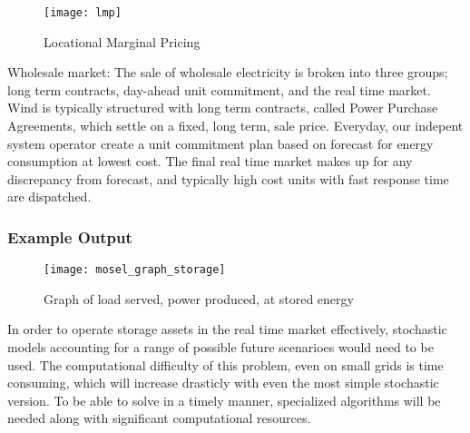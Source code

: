 \begin{figure}
\centering
      \texttt{[image: lmp]}
     \caption{Locational Marginal Pricing}
\end{figure}


Wholesale market:  
      		The sale of wholesale electricity is broken into three groups; long term contracts, day-ahead unit commitment, and the real time market.  Wind is typically structured with long term contracts, called Power Purchase Agreements, which settle on a fixed, long term, sale price.  Everyday, our indepent system operator create a unit commitment plan based on forecast for energy consumption at lowest cost.  The final real time market makes up for any discrepancy from forecast, and typically high cost units with fast response time are dispatched.


\subsubsection{Example Output }

\begin{figure}[h]
\centering
 \texttt{[image: mosel\_graph\_storage]}
 \caption{Graph of load served, power produced, at stored energy}
\end{figure}


In order to operate storage assets in the real time market effectively, stochastic models accounting for a range of possible future scenarioes would need to be used.  The computational difficulty of this problem, even on small grids is time consuming, which will increase drasticly with even the most simple stochastic version.  To be able to solve in a timely manner, specialized algorithms will be needed along with significant computational resources. 

